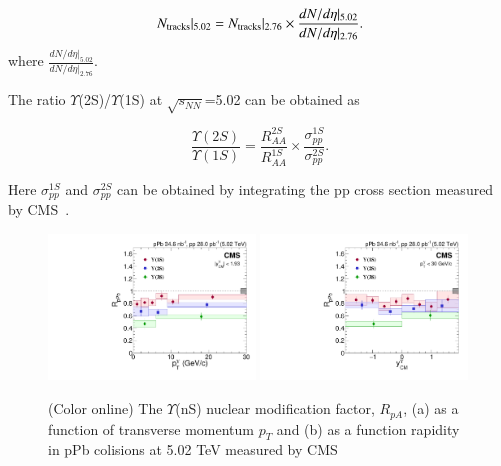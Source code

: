 \begin{equation}
N_{\rm tracks}|_{5.02} =  N_{\rm tracks}|_{2.76} \times \frac{dN/d\eta |_{5.02}} {dN/d\eta|_{2.76}}.
\end{equation}
where $\frac{dN/d\eta |_{5.02}} {dN/d\eta|_{2.76}}$.

The ratio $\Upsilon$(2S)/$\Upsilon$(1S) at $\sqrt{s_{NN}}$=5.02 can be obtained as 

\begin{equation}
\frac{\Upsilon(2S)}{\Upsilon(1S)} = \frac{R_{AA}^{2S}}{R_{AA}^{1S}} \times \frac{\sigma_{pp}^{1S}}{\sigma_{pp}^{2S}}.
\end{equation}

Here $\sigma_{pp}^{1S}$ and $\sigma_{pp}^{2S}$ can be obtained by integrating the pp cross section
measured by CMS~\cite{CMS:2018zza}.


\begin{figure}
  \includegraphics[width=0.49\textwidth]{Figures/ExpOverview/CMS-HIN-18-005_Figure_003-a.pdf}
    \includegraphics[width=0.49\textwidth]{Figures/ExpOverview/CMS-HIN-18-005_Figure_003-b.pdf}
    \caption{(Color online) The $\Upsilon$(nS) nuclear modification factor, $R_{pA}$,
      (a) as a function of transverse momentum $p_{T}$
    and (b) as a function rapidity in pPb colisions at 5.02 TeV measured by CMS~\cite{CMS:2022wfi}
  }
  \label{fig:LHCpPb5}
\end{figure}



